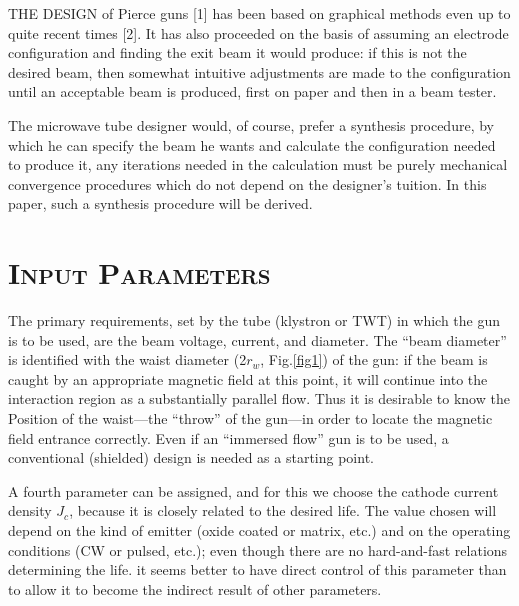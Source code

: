 \documentclass[10pt,a4paper,UTF8,fleqn]{article}
\begin{document}
\lettrine[lines=2]{T}{HE DESIGN} of Pierce guns [1] has been based on graphical methods even up to quite recent times [2]. It has also proceeded on the basis of assuming an electrode configuration and finding the exit beam it would produce: if this is not the desired beam, then somewhat intuitive adjustments are made to the configuration until an acceptable beam is produced, first on paper and then in a beam tester.

The microwave tube designer would, of course, prefer a synthesis procedure, by which he can specify the beam he wants and calculate the configuration needed to produce it, any iterations needed in the calculation must be purely mechanical convergence procedures which do not depend on the designer's tuition. In this paper, such a synthesis procedure will be derived.

\renewcommand{\thefootnote}{\arabic{footnote}}
\section{\textsc{Input Parameters}}
The primary requirements, set by the tube (klystron or TWT) in which the gun is to be used, are the beam voltage, current, and diameter. The ``beam diameter'' is identified with the waist diameter (2$ r_w $, Fig.\ref{fig1}) of the gun: if the beam is caught by an appropriate magnetic field at this point, it will continue into the interaction region as a substantially parallel flow. Thus it is desirable to know the Position of the waist---the ``throw'' of the gun---in order to locate the magnetic field entrance correctly. Even if an ``immersed flow'' gun is to be used, a conventional (shielded) design is needed as a starting point.

A fourth parameter can be assigned, and for this we choose the cathode current density $ J_c $, because it is closely related to the desired life. The value chosen will depend on the kind of emitter (oxide coated or matrix, etc.) and on the operating conditions (CW or pulsed, etc.); even though there are no hard-and-fast relations determining the life. it seems better to have direct control of this parameter than to allow it to become the indirect result of other parameters.
\end{document}
